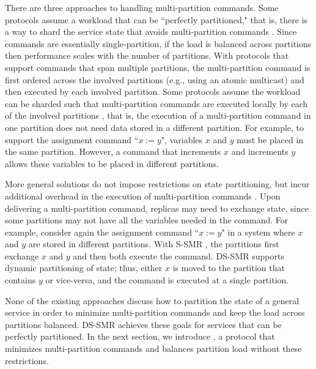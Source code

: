 There are three approaches to handling multi-partition commands.
Some protocols assume a workload that can be ``perfectly partitioned," that is, there is a way to shard the service state that avoids multi-partition commands \cite{hoang2016,Nogueira17}.
Since commands are essentially single-partition, if the load is balanced across partitions then performance scales with the number of partitions.
With protocols that support commands that span multiple partitions, the multi-partition command is first ordered across the involved partitions (e.g., using an atomic multicast) and then executed by each involved partition.
Some protocols assume the workload can be sharded such that multi-partition commands are executed locally by each of the involved partitions \cite{Mu2016}, that is, the execution of a multi-partition command in one partition does not need data stored in a different partition.
For example, to support the assignment command ``$x := y$", variables $x$ and $y$ must be placed in the same partition.
However, a command that increments $x$ and increments $y$ allows these variables to be placed in different partitions.

More general solutions do not impose restrictions on state partitioning, but incur additional overhead in the execution of multi-partition commands \cite{bezerra2014ssmr, hoang2016}.
Upon delivering a multi-partition command, replicas may need to exchange state, since some partitions may not have all the variables needed in the command.
For example, consider again the assignment command ``$x := y$" in a system where $x$ and $y$ are stored in different partitions.
With S-SMR \cite{bezerra2014ssmr}, the partitions first exchange $x$ and $y$ and then both execute the command.
DS-SMR \cite{hoang2016} supports dynamic partitioning of state; thus, either $x$ is moved to the partition that contains $y$ or vice-versa, and the command is executed at a single partition.

None of the existing approaches discuss how to partition the state of a general service in order to minimize multi-partition commands and keep the load across partitions balanced.
DS-SMR \cite{hoang2016} achieves these goals for services that can be perfectly partitioned.
In the next section, we introduce \dynastar, a protocol that minimizes multi-partition commands and balances partition load without these restrictions. 

